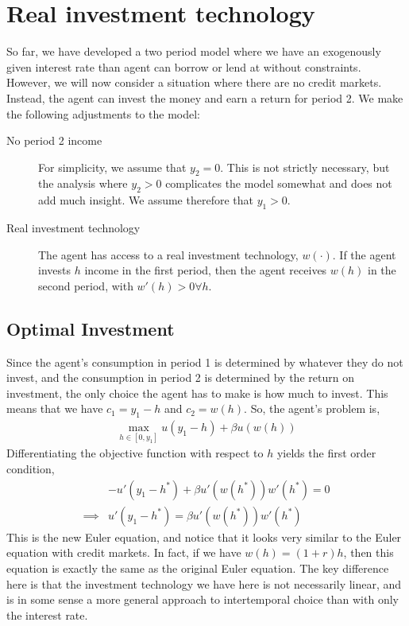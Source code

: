 \section{Real investment technology}
So far, we have developed a two period model where we have an exogenously given interest rate than agent can borrow or lend at without constraints. However, we will now consider a situation where there are no credit markets. Instead, the agent can invest the money and earn a return for period 2. We make the following adjustments to the model:
\begin{description}
    \item[No period 2 income] For simplicity, we assume that $y_2 = 0$. This is not strictly necessary, but the analysis where $y_2 > 0$ complicates the model somewhat and does not add much insight. We assume therefore that $y_1 > 0$.
    \item[Real investment technology] The agent has access to a real investment technology, $w(\cdot)$. If the agent invests $h$ income in the first period, then the agent receives $w(h)$ in the second period, with $w'(h) > 0 \forall h$. 
\end{description}

\subsection*{Optimal Investment}
Since the agent's consumption in period 1 is determined by whatever they do not invest, and the consumption in period 2 is determined by the return on investment, the only choice the agent has to make is how much to invest. This means that we have $c_1 = y_1 - h$ and $c_2 = w(h)$. So, the agent's problem is,
\begin{align*}
    \max_{h \in [0, y_1]} u(y_1 - h) + \beta u(w(h))
\end{align*}
Differentiating the objective function with respect to $h$ yields the first order condition, 
\begin{align*}
    &-u'(y_1 - h^*) + \beta u'(w(h^*)) w'(h^*) = 0 \\
    \implies& u'(y_1 - h^*) = \beta u'(w(h^*)) w'(h^*)
\end{align*}
This is the new Euler equation, and notice that it looks very similar to the Euler equation with credit markets. In fact, if we have $w(h) = (1 + r)h$, then this equation is exactly the same as the original Euler equation. The key difference here is that the investment technology we have here is not necessarily linear, and is in some sense a more general approach to intertemporal choice than with only the interest rate.

